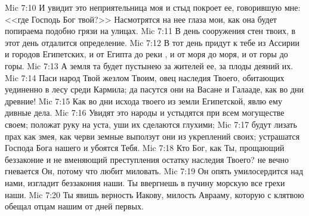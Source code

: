 \vs Mic 7:10 И увидит это неприятельница моя и стыд покроет ее, говорившую мне: <<где Господь Бог твой?>> Насмотрятся на нее глаза мои, как она будет попираема подобно грязи на улицах.
\vs Mic 7:11 В день сооружения стен твоих, в этот день отдалится определение.
\vs Mic 7:12 В тот день придут к тебе из Ассирии и городов Египетских, и от Египта до реки , и от моря до моря, и от горы до горы.
\vs Mic 7:13 А земля та будет пустынею за  жителей ее, за плоды деяний их.
\vs Mic 7:14 Паси народ Твой жезлом Твоим, овец наследия Твоего, обитающих уединенно в лесу среди Кармила; да пасутся они на Васане и Галааде, как во дни древние!
\vs Mic 7:15 Как во дни исхода твоего из земли Египетской, явлю ему дивные дела.
\vs Mic 7:16 Увидят это народы и устыдятся при всем могуществе своем; положат руку на уста, уши их сделаются глухими;
\vs Mic 7:17 будут лизать прах как змея, как черви земные выползут они из укреплений своих; устрашатся Господа Бога нашего и убоятся Тебя.
\vs Mic 7:18 Кто Бог, как Ты, прощающий беззаконие и не вменяющий преступления остатку наследия Твоего? не вечно гневается Он, потому что любит миловать.
\vs Mic 7:19 Он опять умилосердится над нами, изгладит беззакония наши. Ты ввергнешь в пучину морскую все грехи наши.
\vs Mic 7:20 Ты явишь верность Иакову, милость Аврааму, которую с клятвою обещал отцам нашим от дней первых.
